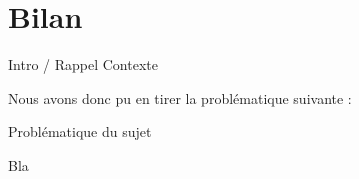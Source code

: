 \chapter{Bilan}

Intro / Rappel Contexte

Nous avons donc pu en tirer la problématique suivante :

\begin{center}
\hskip7mm
Problématique du sujet
\end{center}


Bla

\newpage

